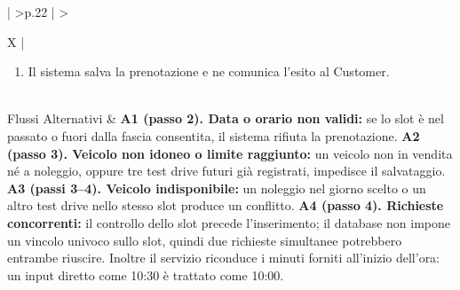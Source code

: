 \begin{xltabular}{\textwidth}{| >{\bfseries}p{.22\textwidth} | >{\raggedright\arraybackslash}X |}
\begin{enumerate}[label=\arabic*.,start=1,leftmargin=*,nosep]
  \item Il sistema salva la prenotazione e ne comunica l'esito al Customer.
\end{enumerate}\\\hline
Flussi Alternativi &
\textbf{A1 (passo 2). Data o orario non validi:} se lo slot è nel passato o fuori dalla fascia consentita, il sistema rifiuta la prenotazione.\newline\newline
\textbf{A2 (passo 3). Veicolo non idoneo o limite raggiunto:} un veicolo non in vendita né a noleggio, oppure tre test drive futuri già registrati, impedisce il salvataggio.\newline\newline
\textbf{A3 (passi 3--4). Veicolo indisponibile:} un noleggio nel giorno scelto o un altro test drive nello stesso slot produce un conflitto.\newline\newline
\textbf{A4 (passo 4). Richieste concorrenti:} il controllo dello slot precede l'inserimento; il database non impone un vincolo univoco sullo slot, quindi due richieste simultanee potrebbero entrambe riuscire. Inoltre il servizio riconduce i minuti forniti all'inizio dell'ora: un input diretto come 10:30 è trattato come 10:00.\\\hline
\end{xltabular}
